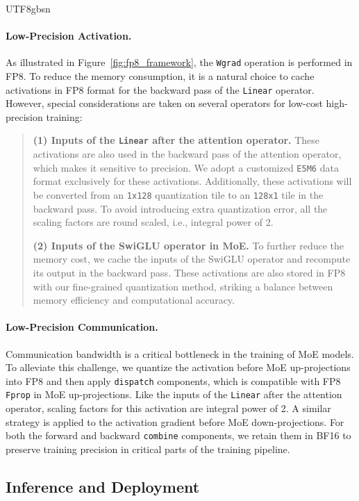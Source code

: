 \documentclass[11pt, a4paper, logo, copyright, nonumbering]{deepseek}
\begin{document}
\begin{CJK*}{UTF8}{gbsn}
\paragraph{Low-Precision Activation.}
As illustrated in Figure~\ref{fig:fp8_framework}, the \texttt{Wgrad} operation is performed in FP8. 
To reduce the memory consumption, it is a natural choice to cache activations in FP8 format for the backward pass of the \texttt{Linear} operator.
However, special considerations are taken on several operators for low-cost high-precision training:
\begin{quote}
\textbf{(1) Inputs of the \texttt{Linear} after the attention operator.} These activations are also used in the backward pass of the attention operator, which makes it sensitive to precision. We adopt a customized \texttt{E5M6} data format exclusively for these activations. Additionally, these activations will be converted from an \texttt{1x128} quantization tile to an \texttt{128x1} tile in the backward pass. To avoid introducing extra quantization error, all the scaling factors are round scaled, i.e., integral power of 2.

\textbf{(2) Inputs of the SwiGLU operator in MoE.} To further reduce the memory cost, we cache the inputs of the SwiGLU operator and recompute its output in the backward pass. These activations are also stored in FP8 with our fine-grained quantization method, striking a balance between memory efficiency and computational accuracy.
\end{quote}

\paragraph{Low-Precision Communication.}
Communication bandwidth is a critical bottleneck in the training of MoE models. 
To alleviate this challenge, we quantize the activation before MoE up-projections into FP8 and then apply \texttt{dispatch} components, which is compatible with FP8 \texttt{Fprop} in MoE up-projections. Like the inputs of the \texttt{Linear} after the attention operator, scaling factors for this activation are integral power of 2.
A similar strategy is applied to the activation gradient before MoE down-projections. 
For both the forward and backward \texttt{combine} components, we retain them in BF16 to preserve training precision in critical parts of the training pipeline.

\subsection{Inference and Deployment}
\label{sec:inference_deployment}


\end{CJK*}
\end{document}
